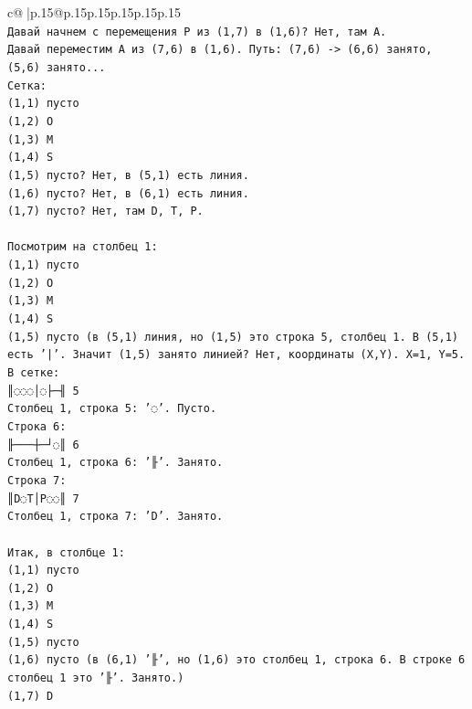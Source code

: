 \documentclass{article}
\begin{document}
{\begin{supertabular}{c@{$\;$}|p{.15\linewidth}@{}p{.15\linewidth}p{.15\linewidth}p{.15\linewidth}p{.15\linewidth}p{.15\linewidth}}
{{{\\ 
\texttt{Давай начнем с перемещения P из (1,7) в (1,6)? Нет, там A.} \\
\texttt{Давай переместим A из (7,6) в (1,6). Путь: (7,6) {-}> (6,6) занято, (5,6) занято...} \\
\texttt{Сетка:} \\
\texttt{(1,1) пусто} \\
\texttt{(1,2) O} \\
\texttt{(1,3) M} \\
\texttt{(1,4) S} \\
\texttt{(1,5) пусто? Нет, в (5,1) есть линия.} \\
\texttt{(1,6) пусто? Нет, в (6,1) есть линия.} \\
\texttt{(1,7) пусто? Нет, там D, T, P.} \\
\\ 
\texttt{Посмотрим на столбец 1:} \\
\texttt{(1,1) пусто} \\
\texttt{(1,2) O} \\
\texttt{(1,3) M} \\
\texttt{(1,4) S} \\
\texttt{(1,5) пусто (в (5,1) линия, но (1,5) это строка 5, столбец 1. В (5,1) есть '|'. Значит (1,5) занято линией? Нет, координаты (X,Y). X=1, Y=5. В сетке:} \\
\texttt{║◌◌◌│◌├─╢ 5} \\
\texttt{Столбец 1, строка 5: '◌'. Пусто.} \\
\texttt{Строка 6:} \\
\texttt{╟───┼─┘◌║ 6} \\
\texttt{Столбец 1, строка 6: '╟'. Занято.} \\
\texttt{Строка 7:} \\
\texttt{║D◌T│P◌◌║ 7} \\
\texttt{Столбец 1, строка 7: 'D'. Занято.} \\
\\ 
\texttt{Итак, в столбце 1:} \\
\texttt{(1,1) пусто} \\
\texttt{(1,2) O} \\
\texttt{(1,3) M} \\
\texttt{(1,4) S} \\
\texttt{(1,5) пусто} \\
\texttt{(1,6) пусто (в (6,1) '╟', но (1,6) это столбец 1, строка 6. В строке 6 столбец 1 это '╟'. Занято.)} \\
\texttt{(1,7) D} \\
}}}
\end{supertabular}}
\end{document}
